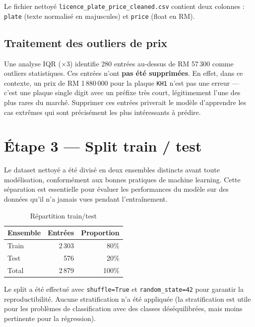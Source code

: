 \documentclass[12pt, a4paper]{article}
\begin{document}
Le fichier nettoyé \texttt{licence\_plate\_price\_cleaned.csv} contient deux colonnes : \texttt{plate} (texte normalisé en majuscules) et \texttt{price} (float en RM).

\subsection{Traitement des outliers de prix}

Une analyse IQR ($\times 3$) identifie 280 entrées au-dessus de RM 57\,300 comme outliers statistiques. Ces entrées n'ont \textbf{pas été supprimées}. En effet, dans ce contexte, un prix de RM 1\,880\,000 pour la plaque \texttt{KH1} n'est pas une erreur — c'est une plaque single digit avec un préfixe très court, légitimement l'une des plus rares du marché. Supprimer ces entrées priverait le modèle d'apprendre les cas extrêmes qui sont précisément les plus intéressants à prédire.

\section{Étape 3 — Split train / test}

Le dataset nettoyé a été divisé en deux ensembles distincts avant toute modélisation, conformément aux bonnes pratiques de machine learning. Cette séparation est essentielle pour évaluer les performances du modèle sur des données qu'il n'a jamais vues pendant l'entraînement.

\begin{table}[H]
\centering
\begin{tabular}{lrr}
\toprule
\textbf{Ensemble} & \textbf{Entrées} & \textbf{Proportion} \\
\midrule
Train & 2\,303 & 80\% \\
Test & 576 & 20\% \\
\midrule
Total & 2\,879 & 100\% \\
\bottomrule
\end{tabular}
\caption{Répartition train/test}
\end{table}

Le split a été effectué avec \texttt{shuffle=True} et \texttt{random\_state=42} pour garantir la reproductibilité. Aucune stratification n'a été appliquée (la stratification est utile pour les problèmes de classification avec des classes déséquilibrées, mais moins pertinente pour la régression).

\end{document}
